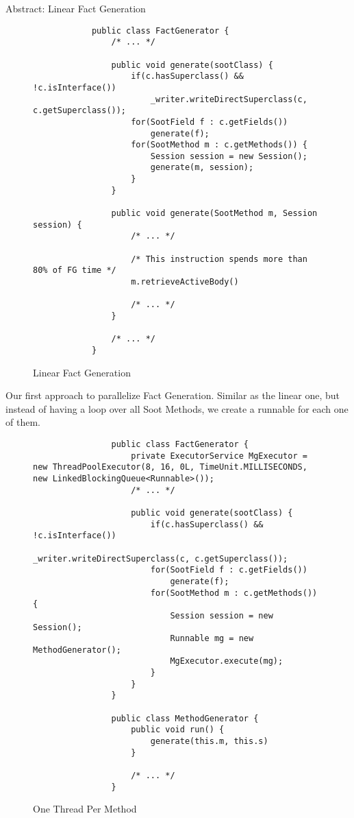 \documentclass{dithesis}
\begin{document}
    Abstract: Linear Fact Generation

    \begin{figure}[H]
        \begin{lstlisting}
            public class FactGenerator {
                /* ... */

                public void generate(sootClass) {
                    if(c.hasSuperclass() && !c.isInterface())
                        _writer.writeDirectSuperclass(c, c.getSuperclass());
                    for(SootField f : c.getFields())
                        generate(f);
                    for(SootMethod m : c.getMethods()) {
                        Session session = new Session();
                        generate(m, session);
                    }
                }

                public void generate(SootMethod m, Session session) {
                    /* ... */
                    
                    /* This instruction spends more than 80% of FG time */
                    m.retrieveActiveBody() 
                    
                    /* ... */
                }

                /* ... */
            }
        \end{lstlisting}
    \caption{Linear Fact Generation}
    \end{figure}

        Our first approach to parallelize Fact Generation. Similar as the linear one, but instead of having a loop over all Soot Methods, we create a runnable for each one of them. 
        \begin{figure}[H]
            \begin{lstlisting}
                public class FactGenerator {
                    private ExecutorService MgExecutor = new ThreadPoolExecutor(8, 16, 0L, TimeUnit.MILLISECONDS, new LinkedBlockingQueue<Runnable>());
                    /* ... */

                    public void generate(sootClass) {
                        if(c.hasSuperclass() && !c.isInterface())
                            _writer.writeDirectSuperclass(c, c.getSuperclass());
                        for(SootField f : c.getFields())
                            generate(f);
                        for(SootMethod m : c.getMethods()) {
                            Session session = new Session();
                            Runnable mg = new MethodGenerator();
                            MgExecutor.execute(mg);
                        }
                    }
                }

                public class MethodGenerator {
                    public void run() {
                        generate(this.m, this.s)
                    }

                    /* ... */
                }
            \end{lstlisting}
        \caption{One Thread Per Method}
        \end{figure}
\end{document}
